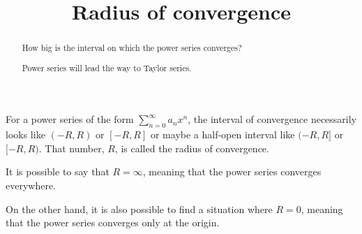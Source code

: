 \documentclass{ximera}
\title{Radius of convergence}
\begin{document}
\begin{abstract}
  How big is the interval on which the power series converges?

  Power series will lead the way to Taylor series.
\end{abstract}

\maketitle

For a power series of the form \(\sum_{n=0}^\infty a_n x^n\), the interval of convergence necessarily looks like \((-R,R)\) or \([-R,R]\) or maybe a half-open interval like \((-R,R]\) or \([-R,R)\).  That number, \(R\), is called the radius of convergence.


It is possible to say that \(R = \infty\), meaning that the power series converges everywhere.


On the other hand, it is also possible to find a situation where \(R = 0\), meaning that the power series converges only at the origin.

\end{document}
